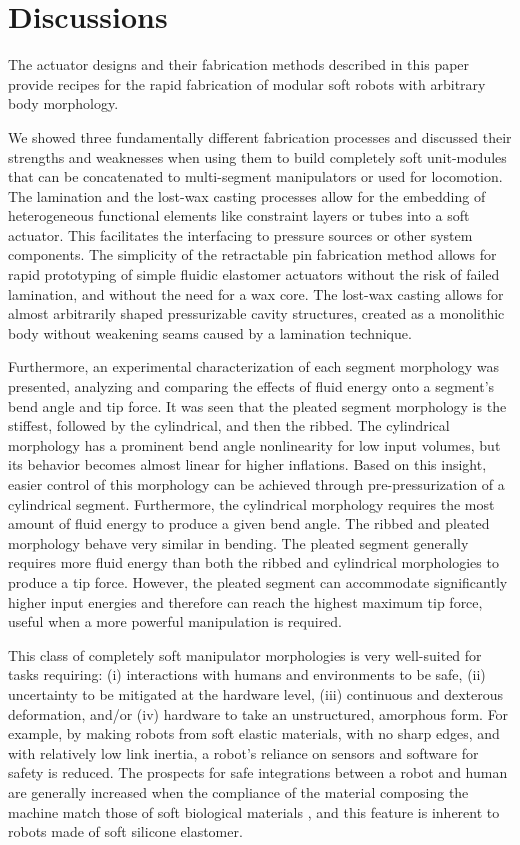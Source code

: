 \section{Discussions}
\label{sec:discussions}
The actuator designs and their fabrication methods described in this paper provide recipes for the rapid fabrication of modular soft robots with arbitrary body morphology.

We showed three fundamentally different fabrication processes and discussed their strengths and weaknesses when using them to build completely soft unit-modules that can be concatenated to multi-segment manipulators or used for locomotion.
%
The lamination and the lost-wax casting processes allow for the embedding of heterogeneous functional elements like constraint layers or tubes into a soft actuator.
This facilitates the interfacing to pressure sources or other system components. 
The simplicity of the retractable pin fabrication method allows for rapid prototyping of simple fluidic elastomer actuators without the risk of failed lamination, and without the need for a wax core.
The lost-wax casting allows for almost arbitrarily shaped pressurizable cavity structures, created as a monolithic body without weakening seams caused by a lamination technique.  

Furthermore, an experimental characterization of each segment morphology was presented, analyzing and comparing the effects of fluid energy onto a segment's bend angle and tip force. 
It was seen that the pleated segment morphology is the stiffest, followed by the cylindrical, and then the ribbed. 
The cylindrical morphology has a prominent bend angle nonlinearity for low input volumes, but its behavior becomes almost linear for higher inflations. 
Based on this insight, easier control of this morphology can be achieved through pre-pressurization of a cylindrical segment.
Furthermore, the cylindrical morphology requires the most amount of fluid energy to produce a given bend angle. 
The ribbed and pleated morphology behave very similar in bending.
The pleated segment generally requires more fluid energy than both the ribbed and cylindrical morphologies to produce a tip force. 
However, the pleated segment can accommodate significantly higher input energies and therefore can reach the highest maximum tip force, useful when a more powerful manipulation is required. 

This class of completely soft manipulator morphologies is very well-suited for tasks requiring: (i) interactions with humans and environments to be safe, (ii) uncertainty to be mitigated at the hardware level, (iii) continuous and dexterous deformation, and/or (iv) hardware to take an unstructured, amorphous form.
%
For example, by making robots from soft elastic materials, with no sharp edges, and with relatively low link inertia, a robot's reliance on sensors and software for safety is reduced.
%
The prospects for safe integrations between a robot and human are generally increased when the compliance of the material composing the machine match those of soft biological materials \citet{majidi2014soft}, and this feature is inherent to robots made of soft silicone elastomer.

